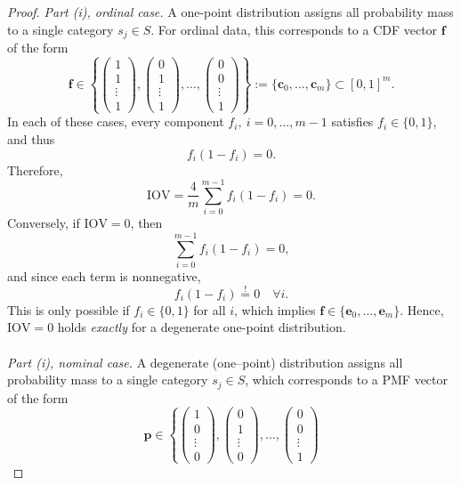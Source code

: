 ﻿\documentclass[12pt,a4paper]{scrreprt}
\theoremstyle{definition}
\begin{document}
\begin{proof}
\textit{Part (i), ordinal case.} %
A one-point distribution assigns all probability mass to a single category
$s_j \in S$.
For ordinal data, this corresponds to a CDF vector $\mathbf{f}$ of the form
\[
\mathbf{f} \in
\left\{
\begin{pmatrix} 1 \\ 1 \\ \vdots \\ 1 \end{pmatrix},
\begin{pmatrix} 0 \\ 1 \\ \vdots \\ 1 \end{pmatrix},
\ldots,
\begin{pmatrix} 0 \\ 0 \\ \vdots \\ 1 \end{pmatrix}
\right\}
:= \{\boldsymbol{c}_0,\ldots,\boldsymbol{c}_m\} \subset [0,1]^{m}.
\]
In each of these cases, every component $f_i,~i=0,\ldots, m-1$ satisfies $f_i \in \{0,1\}$, and thus
\[
f_i(1 - f_i) = 0.
\]
Therefore,
\[
\mathrm{IOV}
= \frac{4}{m}\sum_{i=0}^{m-1} f_i (1 - f_i)
= 0.
\]
Conversely, if $\mathrm{IOV}=0$, then
\[
\sum_{i=0}^{m-1} f_i(1 - f_i) = 0,
\]
and since each term is nonnegative,
\[
f_i(1 - f_i) \overset{!}{=} 0 \quad \forall i.
\]
This is only possible if $f_i \in \{0,1\}$ for all $i$, which implies
$\mathbf{f} \in \{\boldsymbol{e}_0,\ldots,\boldsymbol{e}_m\}$.
Hence, $\mathrm{IOV}=0$ holds \emph{exactly} for a degenerate one-point distribution.\\\\
\textit{Part (i), nominal case.} %
A degenerate (one--point) distribution assigns all probability mass to a single
category $s_j \in S$, which corresponds to a PMF vector of the form
\[
\mathbf{p} \in
\left\{
\begin{pmatrix} 1 \\ 0 \\ \vdots \\ 0 \end{pmatrix},
\begin{pmatrix} 0 \\ 1 \\ \vdots \\ 0 \end{pmatrix},
\ldots,
\begin{pmatrix} 0 \\ 0 \\ \vdots \\ 1 \end{pmatrix}
\]
\end{proof}
\end{document}
